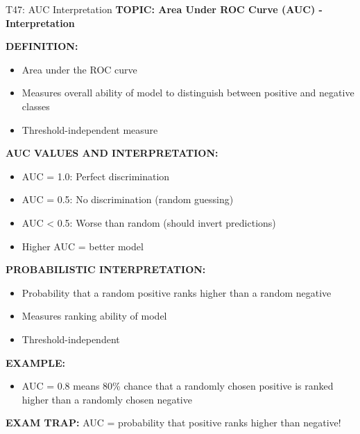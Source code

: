 \documentclass[8pt]{beamer}
\begin{document}
	\begin{frame}{T47: AUC Interpretation}
		\fontsize{6.5}{7.5}\selectfont
		\textbf{TOPIC: Area Under ROC Curve (AUC) - Interpretation}
		
		\vspace{0.1cm}
		\textbf{DEFINITION:}
		\begin{itemize}
			\item Area under the ROC curve
			\item Measures overall ability of model to distinguish between positive and negative classes
			\item Threshold-independent measure
		\end{itemize}
		
		\vspace{0.1cm}
		\textbf{AUC VALUES AND INTERPRETATION:}
		\begin{itemize}
			\item \textcolor{mygreen}{AUC = 1.0:} Perfect discrimination
			\item \textcolor{myblue}{AUC = 0.5:} No discrimination (random guessing)
			\item \textcolor{myred}{AUC < 0.5:} Worse than random (should invert predictions)
			\item \textcolor{mygreen}{Higher AUC = better model}
		\end{itemize}
		
		\vspace{0.1cm}
		\textbf{PROBABILISTIC INTERPRETATION:}
		\begin{itemize}
			\item Probability that a random positive ranks higher than a random negative
			\item Measures ranking ability of model
			\item Threshold-independent
		\end{itemize}
		
		\vspace{0.1cm}
		\textbf{EXAMPLE:}
		\begin{itemize}
			\item AUC = 0.8 means 80\% chance that a randomly chosen positive is ranked higher than a randomly chosen negative
		\end{itemize}
		
		\textcolor{myred}{\textbf{EXAM TRAP:}} AUC = \textcolor{myblue}{probability that positive ranks higher than negative}!
	\end{frame}
	
\end{document}
